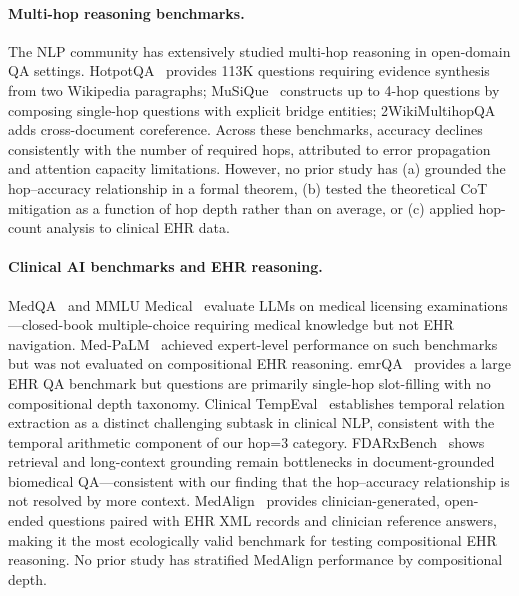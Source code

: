 \documentclass{article}
\begin{document}
\paragraph{Multi-hop reasoning benchmarks.}
The NLP community has extensively studied multi-hop reasoning in open-domain QA settings. HotpotQA~\citep{yang2018hotpotqa} provides 113K questions requiring evidence synthesis from two Wikipedia paragraphs; MuSiQue~\citep{trivedi2022musique} constructs up to 4-hop questions by composing single-hop questions with explicit bridge entities; 2WikiMultihopQA~\citep{ho2020constructing} adds cross-document coreference. Across these benchmarks, accuracy declines consistently with the number of required hops, attributed to error propagation and attention capacity limitations. However, no prior study has (a) grounded the hop--accuracy relationship in a formal theorem, (b) tested the theoretical CoT mitigation as a function of hop depth rather than on average, or (c) applied hop-count analysis to clinical EHR data.

\paragraph{Clinical AI benchmarks and EHR reasoning.}
MedQA~\citep{jin2020disease} and MMLU Medical~\citep{hendrycks2021measuring} evaluate LLMs on medical licensing examinations---closed-book multiple-choice requiring medical knowledge but not EHR navigation. Med-PaLM~\citep{singhal2023large} achieved expert-level performance on such benchmarks but was not evaluated on compositional EHR reasoning. emrQA~\citep{pampari2018emrqa} provides a large EHR QA benchmark but questions are primarily single-hop slot-filling with no compositional depth taxonomy. Clinical TempEval~\citep{bethard2016semeval} establishes temporal relation extraction as a distinct challenging subtask in clinical NLP, consistent with the temporal arithmetic component of our hop=3 category. FDARxBench~\citep{xiong2026fdarxbench} shows retrieval and long-context grounding remain bottlenecks in document-grounded biomedical QA---consistent with our finding that the hop--accuracy relationship is not resolved by more context. MedAlign~\citep{wornow2024medalign} provides clinician-generated, open-ended questions paired with EHR XML records and clinician reference answers, making it the most ecologically valid benchmark for testing compositional EHR reasoning. No prior study has stratified MedAlign performance by compositional depth.
\end{document}
